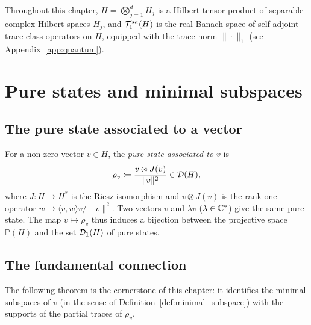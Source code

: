 Throughout this chapter, $H = \bigotimes_{j=1}^d H_j$ is a Hilbert
tensor product of separable complex Hilbert spaces $H_j$,
and $\mathcal{T}_{1}^{sa}(H)$ is the real Banach space of self-adjoint trace-class
operators on $H$, equipped with the trace norm $\|\cdot\|_1$
(see Appendix~\ref{app:quantum}).

\section{Pure states and minimal subspaces}
\label{sec:qs:pure}

\subsection*{The pure state associated to a vector}

For a non-zero vector $v \in H$, the \emph{pure state associated to $v$} is
\begin{equation}
\label{eq:qs:pure_state}
    \rho_v \coloneqq \frac{v \otimes J(v)}{\|v\|^2}
    \in \mathcal{D}(H),
\end{equation}
where $J: H \to H^*$ is the Riesz isomorphism and $v \otimes J(v)$
is the rank-one operator $w \mapsto \langle v, w\rangle v / \|v\|^2$.
Two vectors $v$ and $\lambda v$ ($\lambda \in \mathbb{C}^*$) give the same
pure state. The map $v \mapsto \rho_v$ thus induces a bijection between
the projective space $\mathbb{P}(H)$ and the set $\mathcal{D}_{1}(H)$ of
pure states.

\subsection*{The fundamental connection}

The following theorem is the cornerstone of this chapter: it identifies
the minimal subspaces of $v$ (in the sense of
Definition~\ref{def:minimal_subspace}) with the supports of the
partial traces of $\rho_v$.


